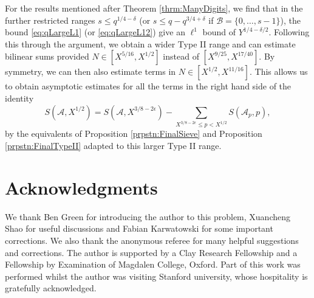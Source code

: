 \documentclass[10pt]{amsart}
\theoremstyle{plain}
\numberwithin{sblmm}{thrm}
\numberwithin{equation}{section}
\begin{document}
For the results mentioned after Theorem \ref{thrm:ManyDigits}, we find that in the further restricted ranges $s\le q^{1/4-\delta}$ (or $s\le q-q^{3/4+\delta}$ if $\mathcal{B}=\{0,\dots,s-1\}$), the bound \eqref{eq:qLargeL1} (or \eqref{eq:qLargeL12}) give an $\ell^1$ bound of $Y^{1/4-\delta/2}$. Following this through the argument, we obtain a wider Type II range and can estimate bilinear sums provided $N\in[X^{5/16},X^{1/2}]$ instead of $[X^{9/25},X^{17/40}]$. By symmetry, we can then also estimate terms in $N\in [X^{1/2},X^{11/16}]$. This allows us to obtain asymptotic estimates for all the terms in the right hand side of the identity
\[
S(\mathcal{A},X^{1/2})=S(\mathcal{A},X^{3/8-2\epsilon})-\sum_{X^{3/8-2\epsilon}\le p<X^{1/2}}S(\mathcal{A}_p,p),
\]
by the equivalents of Proposition \ref{prpstn:FinalSieve} and Proposition \ref{prpstn:FinalTypeII} adapted to this larger Type II range.
%
%
%
%
%
%
\section{Acknowledgments}
We thank Ben Green for introducing the author to this problem, Xuancheng Shao for useful discussions and Fabian Karwatowski for some important corrections. We also thank the anonymous referee for many helpful suggestions and corrections. The author is supported by a Clay Research Fellowship and a Fellowship by Examination of Magdalen College, Oxford. Part of this work was performed whilst the author was visiting Stanford university, whose hospitality is gratefully acknowledged.
%
%
%
%


\end{document}
